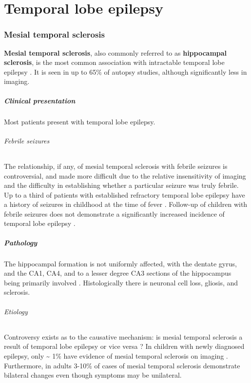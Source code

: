 \chapter{Temporal lobe epilepsy}

\subsection{Mesial temporal sclerosis}

\textbf{Mesial temporal sclerosis}, also commonly referred to as \textbf{hippocampal sclerosis}, is the most common association with intractable temporal lobe epilepsy . It is seen in up to 65\% of autopsy studies, although significantly less in imaging.

\paragraph{Clinical presentation}

Most patients present with temporal lobe epilepsy.

\subparagraph{Febrile seizures}

The relationship, if any, of mesial temporal sclerosis with febrile seizures is controversial, and made more difficult due to the relative insensitivity of imaging and the difficulty in establishing whether a particular seizure was truly febrile. Up to a third of patients with established refractory temporal lobe epilepsy have a history of seizures in childhood at the time of fever . Follow-up of children with febrile seizures does not demonstrate a significantly increased incidence of temporal lobe epilepsy .

\paragraph{Pathology}

The hippocampal formation is not uniformly affected, with the dentate gyrus, and the CA1, CA4, and to a lesser degree CA3 sections of the hippocampus being primarily involved . Histologically there is neuronal cell loss, gliosis, and sclerosis.

\subparagraph{Etiology}

Controversy exists as to the causative mechanism: is mesial temporal sclerosis a result of temporal lobe epilepsy or vice versa ? In children with newly diagnosed epilepsy, only \textasciitilde{} 1\% have evidence of mesial temporal sclerosis on imaging . Furthermore, in adults 3-10\% of cases of mesial temporal sclerosis demonstrate bilateral changes  even though symptoms may be unilateral.

